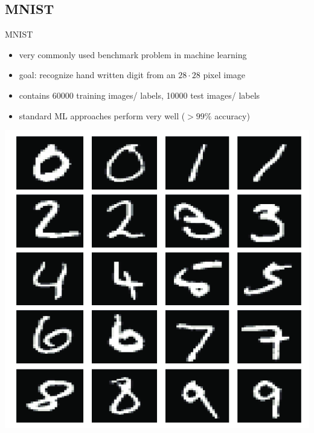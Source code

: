 \documentclass{beamer}
\begin{document}
\subsection{MNIST}

\begin{frame}{MNIST}
\begin{itemize}
	\item very commonly used benchmark problem in machine learning
	\item goal: recognize hand written digit from an \(28 \cdot 28\) pixel image
	\item contains 60000 training images/ labels, 10000 test images/ labels
	\item standard ML approaches perform very well (\(> 99 \%\) accuracy)
\end{itemize}
\begin{center}
	\includegraphics[scale=0.15]{source/mnist.png}
\end{center}
\end{frame}
\end{document}
